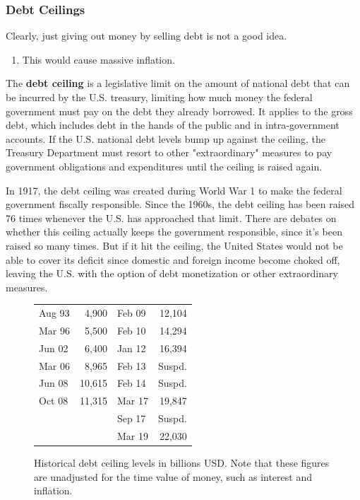 \documentclass{article}
\begin{document}
    \subsubsection{Debt Ceilings}

      Clearly, just giving out money by selling debt is not a good idea. 
      \begin{enumerate}
        \item This would cause massive inflation. 
      \end{enumerate}

      \begin{definition}
        The \textbf{debt ceiling} is a legislative limit on the amount of national debt that can be incurred by the U.S. treasury, limiting how much money the federal government must pay on the debt they already borrowed. It applies to the gross debt, which includes debt in the hands of the public and in intra-government accounts. If the U.S. national debt levels bump up against the ceiling, the Treasury Department must resort to other "extraordinary" measures to pay government obligations and expenditures until the ceiling is raised again.
      \end{definition}

      In 1917, the debt ceiling was created during World War 1 to make the federal government fiscally responsible. Since the 1960s, the debt ceiling has been raised 76 times whenever the U.S. has approached that limit. There are debates on whether this ceiling actually keeps the government responsible, since it's been raised so many times. But if it hit the ceiling, the United States would not be able to cover its deficit since domestic and foreign income become choked off, leaving the U.S. with the option of debt monetization or other extraordinary measures.

      \begin{figure}[H]
        \begin{table}[H]
          \begin{tabular}{|lr|lr|}
          \hline
          Aug 93 & 4,900  & Feb 09 & 12,104 \\
          Mar 96 & 5,500  & Feb 10 & 14,294 \\
          Jun 02 & 6,400  & Jan 12 & 16,394 \\
          Mar 06 & 8,965  & Feb 13 & Suspd. \\
          Jun 08 & 10,615 & Feb 14 & Suspd. \\
          Oct 08 & 11,315 & Mar 17 & 19,847 \\
          &        & Sep 17 & Suspd. \\
          &        & Mar 19 & 22,030 \\
          \hline
          \end{tabular}
        \end{table}
        \caption{Historical debt ceiling levels in billions USD. Note that these figures are unadjusted for the time value of money, such as interest and inflation.} 
        \label{fig:debt_ceilings}
      \end{figure}
      
\end{document}
